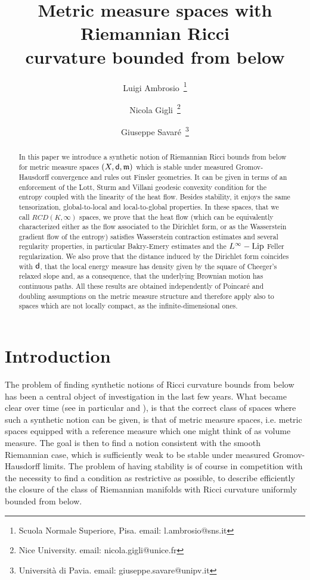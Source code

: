 \documentclass[reqno,11pt]{article}
\title{Metric measure spaces with Riemannian Ricci \\ curvature bounded from below}
\numberwithin{equation}{section}
\newcommand{\mm}{{\mbox{\boldmath$m$}}}
\newcommand{\sfd}{{\sf d}}
\renewcommand{\mm}{\mathfrak m}
\begin{document}
\author{Luigi Ambrosio\
   \thanks{Scuola Normale Superiore, Pisa. email: \textsf{l.ambrosio@sns.it}}
   \and
   Nicola Gigli\
   \thanks{Nice University. email: \textsf{nicola.gigli@unice.fr}}
 \and
   Giuseppe Savar\'e\
   \thanks{Universit\`a di Pavia. email: \textsf{giuseppe.savare@unipv.it}}
   }

\maketitle

\begin{abstract} In this paper we introduce a synthetic notion of
Riemannian Ricci bounds from below for metric measure spaces
$(X,\sfd,\mm)$ which is stable under measured Gromov-Hausdorff
convergence and rules out Finsler geometries. It can be given in
terms of an enforcement of the Lott, Sturm and Villani geodesic
convexity condition for the entropy coupled with the linearity of
the heat flow. Besides stability, it enjoys the same tensorization,
global-to-local and local-to-global properties. In these spaces,
that we call $RCD(K,\infty)$ spaces, we prove that the heat flow
(which can be equivalently characterized either as the flow
associated to the Dirichlet form, or as the Wasserstein gradient
flow of the entropy) satisfies Wasserstein contraction estimates and
several regularity properties, in particular Bakry-Emery estimates
and the $L^\infty-{\rm Lip}$ Feller regularization. We also prove
that the distance induced by the Dirichlet form coincides with
$\sfd$, that the local energy measure has density given by the
square of Cheeger's relaxed slope and, as a consequence, that the
underlying Brownian motion has continuous paths. All these results
are obtained independently of Poincar\'e and doubling assumptions on
the metric measure structure and therefore apply also to spaces
which are not locally compact, as the infinite-dimensional ones.
\end{abstract}

\tableofcontents

\section{Introduction}

The problem of finding synthetic notions of Ricci curvature bounds
from below has been a central object of investigation in the last
few years. What became clear over time (see in particular
\cite{Fukaya87} and \cite[Appendix 2]{Cheeger-Colding97}), is that
the correct class of spaces where such a synthetic notion can be
given, is that of metric measure spaces, i.e. metric spaces equipped
with a reference measure which one might think of as volume measure.
The goal is then to find a notion consistent with the smooth
Riemannian case, which is sufficiently weak to be stable under
measured Gromov-Hausdorff limits. The problem of having stability is
of course in competition with the necessity to find a condition as
restrictive as possible, to describe efficiently the closure of the
class of Riemannian manifolds with Ricci curvature uniformly bounded
from below.
\end{document}

